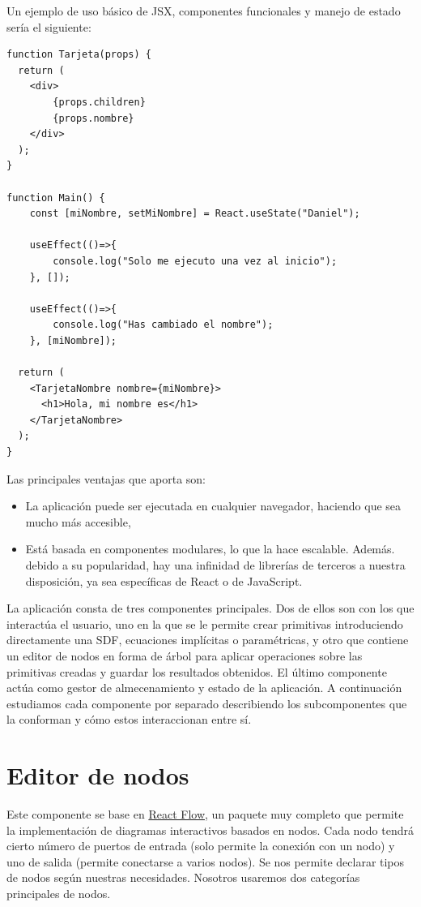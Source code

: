 Un ejemplo de uso básico de JSX, componentes funcionales y manejo de estado sería el siguiente:
\begin{lstlisting}
function Tarjeta(props) {
  return (
    <div>
        {props.children}
        {props.nombre}
    </div>
  );
}

function Main() {
    const [miNombre, setMiNombre] = React.useState("Daniel");

    useEffect(()=>{
        console.log("Solo me ejecuto una vez al inicio");
    }, []);
    
    useEffect(()=>{
        console.log("Has cambiado el nombre");
    }, [miNombre]);
    
  return (
    <TarjetaNombre nombre={miNombre}>
      <h1>Hola, mi nombre es</h1>
    </TarjetaNombre>
  );
}
\end{lstlisting}

Las principales ventajas que aporta son:
\begin{itemize}
    \item La aplicación puede ser ejecutada en cualquier navegador, haciendo que sea mucho más accesible,
    \item Está basada en componentes modulares, lo que la hace escalable. Además. debido a su popularidad, hay una infinidad de librerías de terceros a nuestra disposición, ya sea específicas de React o de JavaScript.
\end{itemize}


La aplicación consta de tres componentes principales. Dos de ellos son con los que interactúa el usuario, uno en la que se le permite crear primitivas introduciendo directamente una SDF, ecuaciones implícitas o paramétricas, y otro que contiene un editor de nodos en forma de árbol para aplicar operaciones sobre las primitivas creadas y guardar los resultados obtenidos. El último componente actúa como gestor de almecenamiento y estado de la aplicación. A continuación estudiamos cada componente por separado describiendo los subcomponentes que la conforman y cómo estos interaccionan entre sí.


\section{Editor de nodos}
Este componente se base en \href{https://github.com/wbkd/react-flow}{React Flow}, un paquete muy completo que permite la implementación de diagramas interactivos basados en nodos. Cada nodo tendrá cierto número de puertos de entrada (solo permite la conexión con un nodo) y uno de salida (permite conectarse a varios nodos). Se nos permite declarar tipos de nodos según nuestras necesidades. Nosotros usaremos dos categorías principales de nodos.\newline

